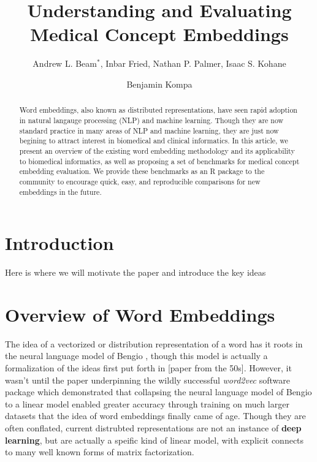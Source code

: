 \documentclass{ws-procs11x85}
\begin{document}
\title{Understanding and Evaluating Medical Concept Embeddings}

\author{Andrew L. Beam$^*$, Inbar Fried, Nathan P. Palmer, Isaac S. Kohane}

\address{Department of Biomedical Informatics, Harvard Medical School,\\
Boston, MA, 02115, USA\\
$^*$E-mail: Andrew\_Beam@hms.harvard.edu\\
www.university\_name.edu}

\author{Benjamin Kompa}

\address{University of North Carolina, Chapel Hill,\\
Chapel Hill, North Carolina ZIP/Zone, USA\\
E-mail: an\_author@laboratory.com}

\begin{abstract}
Word embeddings, also known as distributed representations, have seen rapid adoption in natural langauge processing (NLP) and machine learning. Though they are now standard practice in many areas of NLP and machine learning, they are just now begining to attract interest in biomedical and clinical informatics. In this article, we present an overview of the existing word embedding methodology and its applicability to biomedical informatics, as well as proposing a set of benchmarks for medical concept embedding evaluation. We provide these benchmarks as an R package to the community to encourage quick, easy, and reproducible comparisons for new embeddings in the future.
\end{abstract}


\bodymatter

\section{Introduction}\label{aba:intro}
Here is where we will motivate the paper and introduce the key ideas

\section{Overview of Word Embeddings}\label{aba:intro}
The idea of a vectorized or distribution representation of a word has it roots in the neural language model of Bengio \cite{bengio2003neural}, though this model is actually a formalization of the ideas first put forth in [paper from the 50s]. However, it wasn't until the paper\cite{mikolov2013distributed} underpinning the wildly successful \emph{word2vec} software package which demonstrated that collapsing the neural language model of Bengio\cite{bengio2003neural} to a linear model enabled greater accuracy through training on much larger datasets that the idea of word embeddings finally came of age. Though they are often conflated, current distrubted representations are not an instance of \textbf{deep learning}, but are actually a speific kind of linear model, with explicit connects to many well known forms of matrix factorization. 
\end{document}
